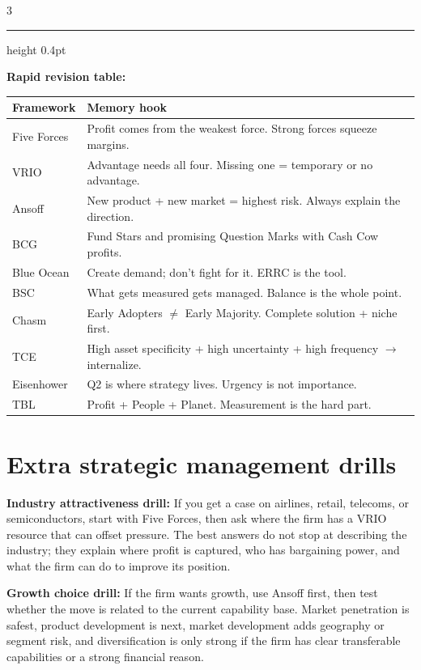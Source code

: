 \documentclass[7.6pt,letterpaper]{article}
\newcommand{\T}[1]{\textbf{\color{navy}#1}}
\newcommand{\sh}{\rowcolor{strip}}
\newcommand{\ctab}[1]{{\fontsize{6.2pt}{7pt}\selectfont\setlength{\tabcolsep}{2.5pt}#1}}
\begin{document}
\begin{multicols}{3}
\vspace{3pt}
{\color{rule}\hrule height 0.4pt}
\vspace{2pt}

\T{Rapid revision table:}

\ctab{\begin{tabular}{@{}p{1.4cm}p{4.2cm}@{}}
\toprule
\sh \T{Framework} & \T{Memory hook} \\
\midrule
Five Forces & Profit comes from the weakest force. Strong forces squeeze margins. \\
VRIO & Advantage needs all four. Missing one = temporary or no advantage. \\
Ansoff & New product + new market = highest risk. Always explain the direction. \\
BCG & Fund Stars and promising Question Marks with Cash Cow profits. \\
Blue Ocean & Create demand; don't fight for it. ERRC is the tool. \\
BSC & What gets measured gets managed. Balance is the whole point. \\
Chasm & Early Adopters $\ne$ Early Majority. Complete solution + niche first. \\
TCE & High asset specificity + high uncertainty + high frequency $\to$ internalize. \\
Eisenhower & Q2 is where strategy lives. Urgency is not importance. \\
TBL & Profit + People + Planet. Measurement is the hard part. \\
\bottomrule
\end{tabular}}

\vspace{2pt}

\section*{Extra strategic management drills}
\T{Industry attractiveness drill:} If you get a case on airlines, retail, telecoms, or semiconductors, start with Five Forces, then ask where the firm has a VRIO resource that can offset pressure. The best answers do not stop at describing the industry; they explain where profit is captured, who has bargaining power, and what the firm can do to improve its position.

\T{Growth choice drill:} If the firm wants growth, use Ansoff first, then test whether the move is related to the current capability base. Market penetration is safest, product development is next, market development adds geography or segment risk, and diversification is only strong if the firm has clear transferable capabilities or a strong financial reason.


\end{multicols}
\end{document}
